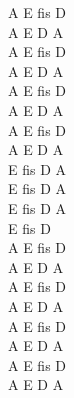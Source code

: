 \documentclass[a5paper, 10pt]{book}
\begin{document}
\begin{minipage}[t]{0.3\textwidth}
A E fis D\\
A E D A\\
A E fis D\\
A E D A\\
A E fis D\\
A E D A\\
A E fis D\\
A E D A\\

E fis D A\\
E fis D A\\
E fis D A\\
E fis D\\

A E fis D\\
A E D A\\
A E fis D\\
A E D A\\
A E fis D\\
A E D A\\
A E fis D\\
A E D A\\
\end{minipage}

\newpage
\end{document}
